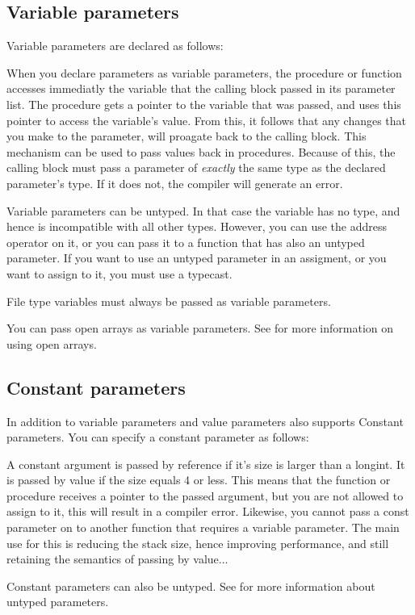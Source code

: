 \documentclass{report}
\begin{document}
\subsection{Variable parameters}
\label{se:varparams}
Variable parameters are declared as follows:

When you declare parameters as variable parameters, the procedure or
function accesses immediatly the variable that the calling block passed in
its parameter list. The procedure gets a pointer to the variable that was
passed, and uses this pointer to access the variable's value.
From this, it follows that any changes that you make to the parameter, will
proagate back to the calling block. This mechanism can be used to pass
values back in procedures.
Because of this, the calling block must pass a parameter of {\em exactly}
the same type as the declared parameter's type. If it does not, the compiler
will generate an error.

Variable parameters can be untyped. In that case the variable has no type,
and hence is incompatible with all other types. However, you can use the
address operator on it, or you can pass it to a function that has also an
untyped parameter. If you want to use an untyped parameter in an assigment,
or you want to assign to it, you must use a typecast.

File type variables must always be passed as variable parameters.

You can pass open arrays as variable parameters. See  for
more information on using open arrays.
\subsection{Constant parameters}
In addition to variable parameters and value parameters \fpc also supports
Constant parameters. You can specify a constant parameter as follows:

A constant argument is passed by reference if it's size is larger than a
longint. It is passed by value if the size equals 4 or less.
This means that the function or procedure receives a pointer to the passed
argument, but you are not allowed to assign to it, this will result in a
compiler error. Likewise, you cannot pass a const parameter on to another
function that requires a variable parameter.
The main use for this is reducing the stack size, hence improving
performance, and still retaining the semantics of passing by value...

Constant parameters can also be untyped. See  for more
information about untyped parameters.
\end{document}
